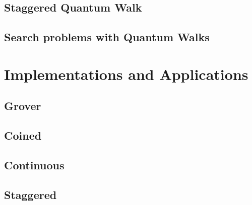 \documentclass[
oneside,
11pt, a4paper,
footinclude=true,
headinclude=true,
cleardoublepage=empty
]{scrbook}
\begin{document}
\section{Staggered Quantum Walk}\label{stagWalk}

\section{Search problems with Quantum Walks}


\chapter{Implementations and Applications}
\section{Grover}
\section{Coined}\label{coinedQWQiskit}

\section{Continuous}
\section{Staggered}
\end{document}
